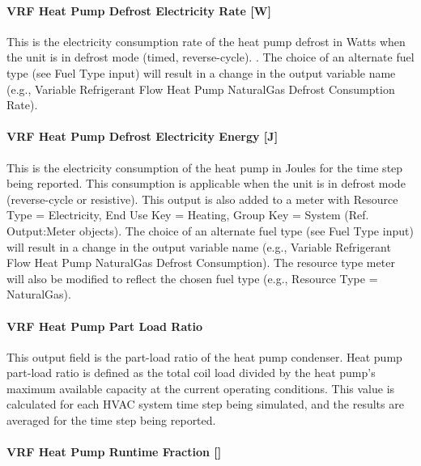 \paragraph{VRF Heat Pump Defrost Electricity Rate {[}W{]}}\label{vrf-heat-pump-defrost-electric-power-w}

This is the electricity consumption rate of the heat pump defrost in Watts when the unit is in defrost mode (timed, reverse-cycle). . The choice of an alternate fuel type (see Fuel Type input) will result in a change in the output variable name (e.g., Variable Refrigerant Flow Heat Pump NaturalGas Defrost Consumption Rate).

\paragraph{VRF Heat Pump Defrost Electricity Energy {[}J{]}}\label{vrf-heat-pump-defrost-electric-energy-j}

This is the electricity consumption of the heat pump in Joules for the time step being reported. This consumption is applicable when the unit is in defrost mode (reverse-cycle or resistive). This output is also added to a meter with Resource Type = Electricity, End Use Key = Heating, Group Key = System (Ref. Output:Meter objects). The choice of an alternate fuel type (see Fuel Type input) will result in a change in the output variable name (e.g., Variable Refrigerant Flow Heat Pump NaturalGas Defrost Consumption). The resource type meter will also be modified to reflect the chosen fuel type (e.g., Resource Type = NaturalGas).

\paragraph{VRF Heat Pump Part Load Ratio}\label{vrf-heat-pump-part-load-ratio}

This output field is the part-load ratio of the heat pump condenser. Heat pump part-load ratio is defined as the total coil load divided by the heat pump's maximum available capacity at the current operating conditions. This value is calculated for each HVAC system time step being simulated, and the results are averaged for the time step being reported.

\paragraph{\texorpdfstring{VRF Heat Pump Runtime Fraction {[]}}{VRF Heat Pump Runtime Fraction }}\label{vrf-heat-pump-runtime-fraction}

